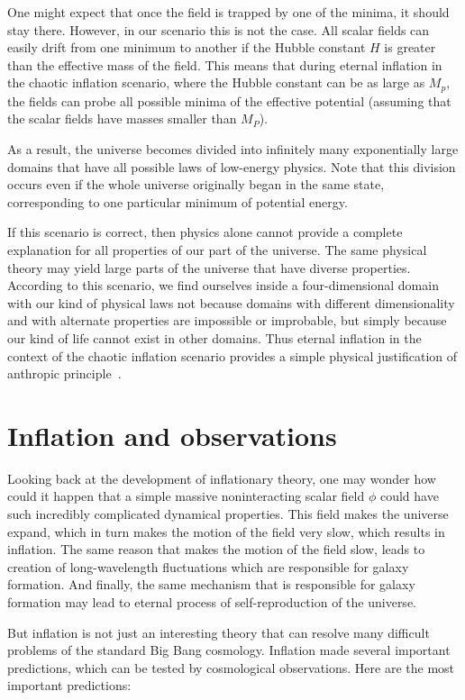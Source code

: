 \documentclass[a4paper,12pt]{article}
\begin{document}
One might expect that once the field is trapped by one of the minima, it should stay there. However, in our scenario this is not the case. All scalar fields can easily drift from one minimum to another if the Hubble constant $H$ is greater than the effective mass of the field. This means that during eternal inflation in the chaotic inflation scenario, where the Hubble constant can be as large as $M_p$, the fields can probe all possible minima of the effective potential (assuming that the scalar fields have masses smaller than $M_P$).


    As a result, the universe  becomes divided into infinitely many exponentially large domains that have all possible  laws of low-energy physics. Note that this
division occurs even if the whole universe originally began in the same
state, corresponding to one particular minimum of potential energy.
 

If this scenario is correct, then physics alone cannot provide a complete
explanation for all properties of our part of the universe.   The same
physical theory may yield large parts of the universe that have diverse
properties.  According to this scenario, we find ourselves inside a
four-dimensional domain with our kind of physical laws not because
domains with different dimensionality and with alternate properties are
impossible or improbable, but simply because our kind of life cannot
exist in other domains. Thus eternal inflation in the context of the chaotic inflation scenario provides a simple physical justification of anthropic principle~\cite{Eternal,book}.



\section{Inflation and observations}
Looking back at the development of inflationary theory, one may wonder how could it happen that  a simple  massive noninteracting scalar field $\phi$ could have such incredibly complicated dynamical properties. This field makes the universe expand, which in turn makes the motion of the field very slow, which results in inflation. The same reason that makes the motion of the field slow, leads to creation of long-wavelength fluctuations which are responsible for galaxy formation. And finally, the same mechanism that is responsible for galaxy formation may lead to eternal process of self-reproduction of the universe. 

But inflation is not just an interesting theory that can resolve many difficult problems of the standard Big Bang cosmology. Inflation made several important predictions, which can be tested by cosmological observations. Here are the most important predictions: 
\end{document}
